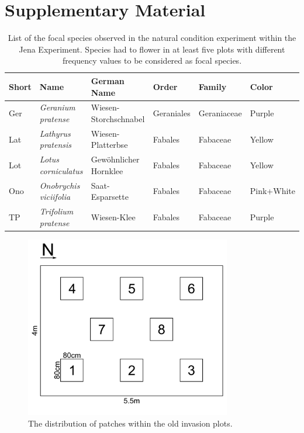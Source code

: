 \label{ch:supplementary_material}

\section*{Supplementary Material}
\beginsupplement

\begin{table}[htbp]
	\centering
	\caption{List of the focal species observed in the natural condition experiment within the Jena Experiment. Species had to flower in at least five plots with different frequency values to be considered as focal species.}
	\begin{tabular}{llllll}
		\toprule
		\textbf{Short} & \textbf{Name} & \textbf{German Name} & \textbf{Order} & \textbf{Family} & \textbf{Color} \\
		\midrule
		Ger   & \textit{Geranium pratense} & Wiesen-Storchschnabel & Geraniales & Geraniaceae & Purple \\
		Lat   & \textit{Lathyrus pratensis} & Wiesen-Platterbse & Fabales & Fabaceae & Yellow \\
		Lot   & \textit{Lotus corniculatus} & Gewöhnlicher Hornklee & Fabales & Fabaceae & Yellow \\
		Ono   & \textit{Onobrychis viciifolia} & Saat-Esparsette & Fabales & Fabaceae & Pink+White \\
		TP    & \textit{Trifolium pratense} & Wiesen-Klee & Fabales & Fabaceae & Purple \\
		\bottomrule
	\end{tabular}%
	\label{tab:Species}
\end{table}%


\begin{figure} [H] %
\centering
\includegraphics[width=9cm]{Images/plot-design}
 \caption{The distribution of patches within the old invasion plots.}
 \label{fig:plot-design}
\end{figure}


